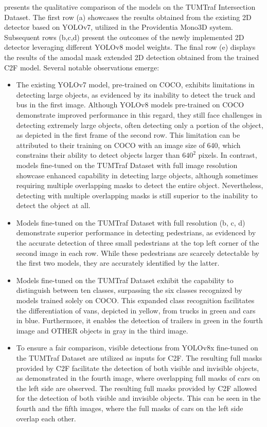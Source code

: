  presents the qualitative comparison of the models on the TUMTraf Intersection Dataset. The first row (a) showcases the results obtained from the existing 2D detector based on YOLOv7, utilized in the Providentia Mono3D system. Subsequent rows (b,c,d) present the outcomes of the newly implemented 2D detector leveraging different YOLOv8 model weights. The final row (e) displays the results of the amodal mask extended 2D detection obtained from the trained C2F model. Several notable observations emerge:

\begin{itemize}
	\item 
	The existing YOLOv7 model, pre-trained on COCO, exhibits limitations in detecting large objects, as evidenced by its inability to detect the truck and bus in the first image. Although YOLOv8 models pre-trained on COCO demonstrate improved performance in this regard, they still face challenges in detecting extremely large objects, often detecting only a portion of the object, as depicted in the first frame of the second row. 
	This limitation can be attributed to their training on COCO with an image size of 640, which constrains their ability to detect objects larger than $640^2$ pixels. In contrast, models fine-tuned on the TUMTraf Dataset with full image resolution showcase enhanced capability in detecting large objects, although sometimes requiring multiple overlapping masks to detect the entire object. Nevertheless, detecting with multiple overlapping masks is still superior to the inability to detect the object at all. 
	\item Models fine-tuned on the TUMTraf Dataset with full resolution (b, c, d) demonstrate superior performance in detecting pedestrians, as evidenced by the accurate detection of three small pedestrians at the top left corner of the second image in each row. While these pedestrians are scarcely detectable by the first two models, they are accurately identified by the latter.
	\item Models fine-tuned on the TUMTraf Dataset exhibit the capability to distinguish between ten classes, surpassing the six classes recognized by models trained solely on COCO. This expanded class recognition facilitates the differentiation of vans, depicted in yellow, from trucks in green and cars in blue. Furthermore, it enables the detection of trailers in green in the fourth image and OTHER objects in gray in the third image.
	\item To ensure a fair comparison, visible detections from YOLOv8x fine-tuned on the TUMTraf Dataset are utilized as inputs for C2F. 
	The resulting full masks provided by C2F facilitate the detection of both visible and invisible objects, as demonstrated in the fourth image, where overlapping full masks of cars on the left side are observed. The resulting full masks provided by C2F allowed for the detection of both visible and invisible objects. This can be seen in the fourth and the fifth images, where the full masks of cars on the left side overlap each other.
	

\end{itemize}
